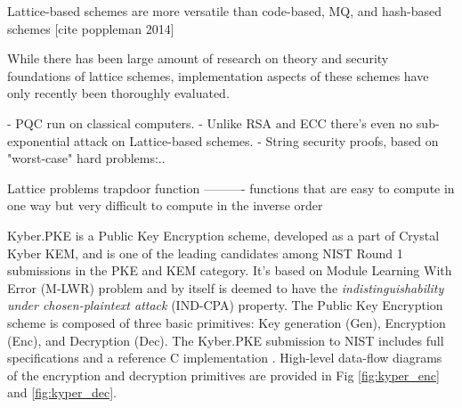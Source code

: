     Lattice-based schemes are more versatile than code-based, MQ, and hash-based schemes [cite poppleman 2014]


    While there has been large amount of research on theory and security foundations of lattice schemes,
     implementation aspects of these schemes have only recently been thoroughly evaluated.





- PQC run on classical computers.
- Unlike RSA and ECC there's even no sub-exponential attack on Lattice-based schemes.
- String security proofs, based on "worst-case" hard problems:..




Lattice problems
trapdoor function
----------
functions that are easy to compute in one way but very difficult to compute in the inverse order





Kyber.PKE\cite{bos2018} is a Public Key Encryption scheme, developed as a part of Crystal Kyber KEM, 
and is one of the leading candidates among NIST Round 1 submissions in the PKE and KEM category.
 It’s based on Module Learning With Error (M-LWR) problem and by itself is deemed to have
  the \textit{indistinguishability under chosen-plaintext attack} (IND-CPA) property. The Public
   Key Encryption scheme is composed of three basic primitives: Key generation (Gen), 
   Encryption (Enc), and Decryption (Dec). The Kyber.PKE submission to NIST includes full
    specifications and a reference C implementation 
    \cite{kyberres}. High-level data-flow diagrams of
     the encryption and decryption primitives are provided in Fig \ref{fig:kyper_enc} and \ref{fig:kyper_dec}.


